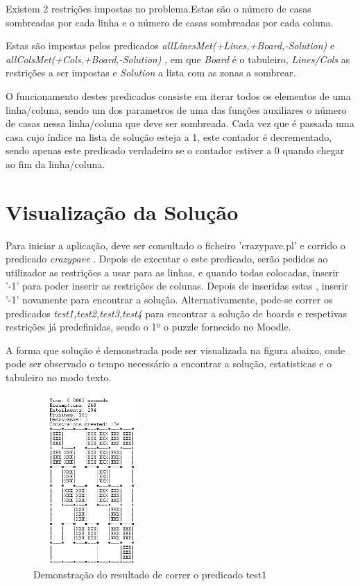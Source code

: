 \documentclass[runningheads,a4paper,12pt]{llncs}
\begin{document}
Existem 2 restrições impostas no problema.Estas são o número de casas sombreadas por cada linha e o número de casas sombreadas por cada coluna.

Estas são impostas pelos predicados \textit{allLinesMet(+Lines,+Board,-Solution)} e \textit{allColsMet(+Cols,+Board,-Solution)} , em que \textit{Board} é o tabuleiro, \textit{Lines/Cols} as restrições a ser impostas e \textit{Solution} a lista com as zonas a sombrear.

O funcionamento destes predicados consiste em iterar todos os elementos de uma linha/coluna, sendo um dos parametros de uma das funções auxiliares o número de casas nessa linha/coluna que deve ser sombreada.
Cada vez que é passada uma casa cujo índice na lista de solução esteja a 1, este contador é decrementado, sendo apenas este predicado verdadeiro se o contador estiver a 0 quando chegar ao fim da linha/coluna.


\section{Visualização da Solução}

Para iniciar a aplicação, deve ser consultado o ficheiro 'crazypave.pl' e corrido o predicado \textit{crazypave} .
Depois de executar o este predicado, serão pedidos ao utilizador as restrições a usar para as linhas, e quando todas colocadas, inserir '-1' para poder inserir as restrições de colunas.
Depois de inseridas estas , inserir '-1' novamente para encontrar a solução.
Alternativamente, pode-se correr os predicados \textit{test1,test2,test3,test4} para encontrar a solução de boards e respetivas restrições já predefinidas, sendo o 1º o puzzle fornecido no Moodle.

A forma que solução é demonstrada pode ser visualizada na figura abaixo, onde pode ser observado o tempo necessário a encontrar a solução, estatisticas e o tabuleiro no modo texto.



\begin{figure}
\centering
\includegraphics[height=6.5cm,width=4.5cm]{exemplo4.png}
\caption{Demonstração do resultado de correr o predicado test1} 
\label{fig:crazypavementexandsol}
\end{figure}
\end{document}
